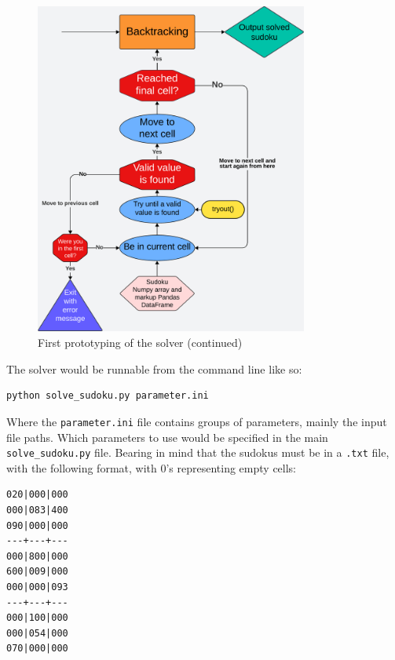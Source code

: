 \documentclass[12pt]{report} %
\begin{document}
\begin{figure}[bthp]
  \centering
  \includegraphics[width=0.8\textwidth]{prototyping1_next.png}
  \caption{First prototyping of the solver (continued)}
\end{figure}

\newpage
The solver would be runnable from the command line like so:

\begin{lstlisting}[language=bash]
  python solve_sudoku.py parameter.ini
\end{lstlisting}

Where the \texttt{parameter.ini} file contains groups of parameters, mainly the input file paths. Which parameters to use would be specified in the main \texttt{solve\_sudoku.py} file. Bearing in mind that the sudokus must be in a \texttt{.txt} file, with the following format, with 0's representing empty cells:

\vspace*{1\baselineskip}
\begin{lstlisting}[caption = {Sudoku input format example}]
020|000|000
000|083|400
090|000|000
---+---+---
000|800|000
600|009|000
000|000|093
---+---+---
000|100|000
000|054|000
070|000|000
\end{lstlisting}
\end{document}
